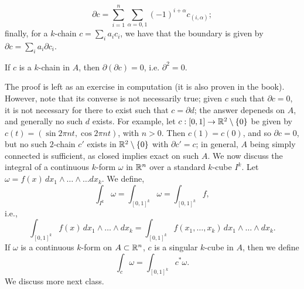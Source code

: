 \[ \partial c = \sum_{i=1}^n \sum_{\alpha = 0, 1} (-1)^{i+\alpha} c_{(i, \alpha)}; \]
finally, for a $k$-chain $c = \sum_i a_ic_i$, we have that the boundary is given by $\partial c = \sum_i a_i \partial c_i$.
\begin{simpleprop}[Spivak 4-12]
    If $c$ is a $k$-chain in $A$, then $\partial(\partial c) = 0$, i.e. $\partial^2 = 0$.
\end{simpleprop}
\noindent The proof is left as an exercise in computation (it is also proven in the book). However, note that its converse is not necessarily true; given $c$ such that $\partial c = 0$, it is not necessary for there to exist such that $c = \partial d$; the answer depeneds on $A$, and generally no such $d$ exists. For example, let $c : [0, 1] \to \mathbb R^2 \setminus \{0\}$ be given by $c(t) = (\sin 2\pi n t, \cos 2\pi n t)$, with $n > 0$. Then $c(1) = c(0)$, and so $\partial c = 0$, but no such $2$-chain $c'$ exists in $\mathbb R^2 \setminus \{0\}$ with $\partial c' = c$; in general, $A$ being simply connected is sufficient, as closed implies exact on such $A$.
\medskip\newline
We now discuss the integral of a continuous $k$-form $\omega$ in $\mathbb R^n$ over a standard $k$-cube $I^k$. Let $\omega = f(x) \, dx_1 \wedge \dots \wedge \dots dx_k$. We define,
\[ \int_{I^k} \omega = \int_{[0, 1]^k} \omega = \int_{[0, 1]^k} f, \]
i.e.,
\[ \int_{[0, 1]^k} f(x) \, dx_1 \wedge \dots \wedge dx_k = \int_{[0, 1]^k} f(x_1, \dots, x_k) \, dx_1 \wedge \dots \wedge dx_k. \]
If $\omega$ is a continuous $k$-form on $A \subset \mathbb R^n$, $c$ is a singular $k$-cube in $A$, then we define
\[ \int_c \omega = \int_{[0, 1]^k} c^\ast \omega. \]
We discuss more next class.